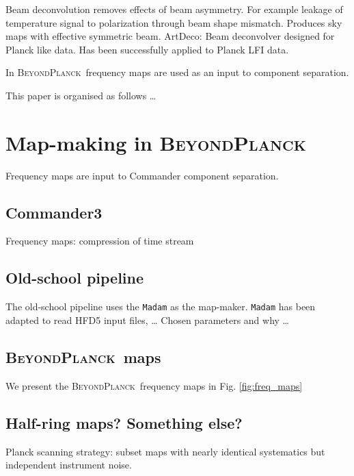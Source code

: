 \documentclass[twocolumn]{aa}
\newcommand{\BP}{\textsc{BeyondPlanck}}
\begin{document}
Beam deconvolution removes effects of beam asymmetry. For example leakage of temperature signal to polarization through beam shape mismatch. Produces sky maps with effective symmetric beam. ArtDeco: Beam deconvolver designed for Planck like data. Has been successfully applied to Planck LFI data.

In \BP\ frequency maps are used as an input to component separation.

This paper is organised as follows \dots

\newpage

\section{Map-making in \BP}

Frequency maps are input to Commander component separation.

\subsection{Commander3}

Frequency maps: compression of time stream


\subsection{Old-school pipeline}

The old-school pipeline uses the {\tt Madam} as the map-maker.  {\tt Madam} has been adapted to read HFD5 input files, \dots
Chosen parameters and why \dots

\subsection{\BP\ maps}
We present the \BP\ frequency maps in Fig. \ref{fig:freq_maps}
\begin{figure*}
  \caption{Commander3 frequency maps for 30, 44 and 70 GHz.}\label{fig:freq_maps}
\end{figure*}

\subsection{Half-ring maps? Something else?}

Planck scanning strategy: subset maps with nearly identical systematics but independent instrument noise.
\end{document}
